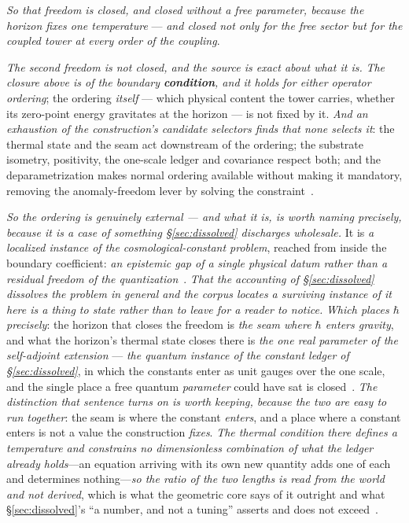\documentclass[11pt,a4paper]{article}
\theoremstyle{plain}
\theoremstyle{definition}
\begin{document}
\emph{So that freedom is closed, and closed without a free parameter, because the horizon fixes one
temperature} --- \emph{and closed not only for the free sector but for the coupled tower at every order of
the coupling}.

\emph{The second freedom is not closed, and the source is exact about what it is.} \emph{The closure above is
of the boundary \textbf{condition}, and it holds for either operator ordering}; the ordering \emph{itself}
--- which physical content the tower carries, whether its zero-point energy gravitates at the horizon --- is
not fixed by it. \emph{And an exhaustion of the construction's candidate selectors finds that none selects
it}: the thermal state and the seam act downstream of the ordering; the substrate isometry, positivity, the
one-scale ledger and covariance respect both; and the deparametrization makes normal ordering available
without making it mandatory, removing the anomaly-freedom lever by solving the constraint~\cite{JanzenCRframework}.

\emph{So the ordering is genuinely external --- and what it is, is worth naming precisely, because it is a
case of something \S\ref{sec:dissolved} discharges wholesale.} It is \emph{a localized instance of the
cosmological-constant problem}, reached from inside the boundary coefficient: \emph{an epistemic gap of a
single physical datum rather than a residual freedom of the
quantization}~\cite{JanzenCRframework}. \emph{That the accounting of \S\ref{sec:dissolved} dissolves the
problem in general and the corpus locates a surviving instance of it here is a thing to state rather than to
leave for a reader to notice.} \emph{Which places $\hbar$ precisely}: the horizon that closes the freedom is \emph{the seam where $\hbar$
enters gravity}, and what the horizon's thermal state closes there is \emph{the one real parameter of the
self-adjoint extension} --- \emph{the quantum instance of the constant ledger of \S\ref{sec:dissolved}}, in
which the constants enter as unit gauges over the one scale, and the single place a free quantum
\emph{parameter} could have sat is closed~\cite{JanzenCanonicalTime}. \emph{The distinction that sentence
turns on is worth keeping, because the two are easy to run together}: the seam is where the constant
\emph{enters}, and a place where a constant enters is not a value the construction \emph{fixes}. \emph{The
thermal condition there defines a temperature and constrains no dimensionless combination of what the
ledger already holds}---an equation arriving with its own new quantity adds one of each and determines
nothing---\emph{so the ratio of the two lengths is read from the world and not derived}, which is what the
geometric core says of it outright and what \S\ref{sec:dissolved}'s ``a number, and not a tuning'' asserts
and does not exceed~\cite{JanzenGeometricCore, JanzenCanonicalTime}.
\end{document}
